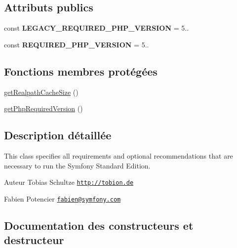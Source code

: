 \subsection*{Attributs publics}
\begin{DoxyCompactItemize}
\item 
\mbox{\label{classSymfonyRequirements_aadd8789c5e6de1ef1b13c78dcf985a28}} 
const {\bfseries L\+E\+G\+A\+C\+Y\+\_\+\+R\+E\+Q\+U\+I\+R\+E\+D\+\_\+\+P\+H\+P\+\_\+\+V\+E\+R\+S\+I\+ON} = \textquotesingle{}5..\textquotesingle{}
\item 
\mbox{\label{classSymfonyRequirements_af0e0b5455bf96b10af63695ab61c5137}} 
const {\bfseries R\+E\+Q\+U\+I\+R\+E\+D\+\_\+\+P\+H\+P\+\_\+\+V\+E\+R\+S\+I\+ON} = \textquotesingle{}5..\textquotesingle{}
\end{DoxyCompactItemize}
\subsection*{Fonctions membres protégées}
\begin{DoxyCompactItemize}
\item 
\hyperlink{classSymfonyRequirements_a32cc5be91d7f8049b0f49ef118e2cd04}{get\+Realpath\+Cache\+Size} ()
\item 
\hyperlink{classSymfonyRequirements_ae0578284b71aadf39c3457fc5d3f5aa1}{get\+Php\+Required\+Version} ()
\end{DoxyCompactItemize}


\subsection{Description détaillée}
This class specifies all requirements and optional recommendations that are necessary to run the Symfony Standard Edition.

\begin{DoxyAuthor}{Auteur}
Tobias Schultze \href{http://tobion.de}{\tt http\+://tobion.\+de} 

Fabien Potencier \href{mailto:fabien@symfony.com}{\tt fabien@symfony.\+com} 
\end{DoxyAuthor}


\subsection{Documentation des constructeurs et destructeur}
\mbox{\label{classSymfonyRequirements_a9543e8a8cb4c134200fd19a3052cac38}} 
